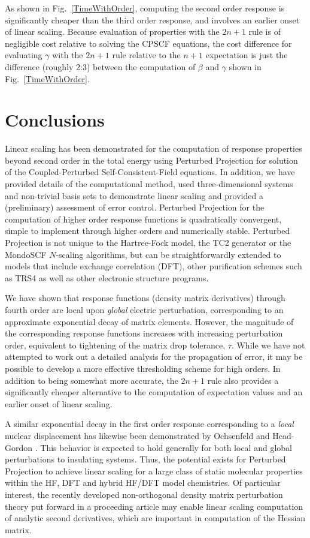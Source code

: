 \documentclass[prl,aps,preprint,showpacs,superbib]{revtex4}
\begin{document}
As shown in Fig.~\ref{TimeWithOrder}, computing the second order response is significantly cheaper 
than the third order response, and involves an earlier onset of linear scaling. Because evaluation 
of properties with the $2 n+1$ rule is of negligible cost relative to solving the CPSCF equations, the cost 
difference for evaluating $\gamma$ with the $2 n+1$ rule relative to the $n+1$ expectation is just the 
difference (roughly 2:3) between the computation of $\beta$ and $\gamma$ shown in Fig.~\ref{TimeWithOrder}.

\section{Conclusions}

Linear scaling has been demonstrated for the computation of response properties beyond second
order in the total energy using Perturbed Projection for solution of the 
Coupled-Perturbed Self-Consistent-Field equations.
In addition, we have provided details of 
the computational method, used three-dimensional systems and non-trivial basis sets
to demonstrate linear scaling and provided a (preliminary) assessment of 
error control.  Perturbed Projection for the 
computation of higher order response functions is quadratically convergent, simple 
to implement through higher orders and numerically stable.  Perturbed Projection is 
not unique to the Hartree-Fock model, the TC2 generator or the {\sc MondoSCF} 
$N$-scaling algorithms, but can be straightforwardly extended to models that include 
exchange correlation (DFT), other purification schemes such as TRS4 \cite{ANiklasson03}
as well as other electronic structure programs.  

We have shown that response functions (density matrix derivatives) through fourth 
order are local upon {\em global} electric perturbation, corresponding to an 
approximate exponential decay of matrix elements.  However, the magnitude of the 
corresponding response functions increases with increasing perturbation order, equivalent 
to tightening of the matrix drop tolerance, $\tau$.   While we have not attempted to 
work out a detailed analysis for the propagation of error, it may be possible 
to develop a more effective thresholding scheme for high orders. In addition 
to being somewhat more accurate, the $2 n+1$ rule also provides a significantly 
cheaper alternative to the computation of expectation values and an earlier onset 
of linear scaling. 

A similar exponential decay in the first order response corresponding to a {\em local} nuclear 
displacement has likewise been demonstrated by Ochsenfeld and Head-Gordon \cite{Ochsenfeld97}. 
This behavior is expected to hold generally for both local and global perturbations to 
insulating systems.  Thus, the potential exists for Perturbed Projection to achieve linear scaling
for a large class of static molecular properties within the HF, DFT and hybrid HF/DFT model 
chemistries. Of particular interest, the recently developed non-orthogonal density matrix perturbation 
theory put forward in a proceeding article \cite{ANiklasson05a} may enable 
linear scaling computation of analytic second derivatives, which are important 
in computation of the Hessian matrix.  
\end{document}
